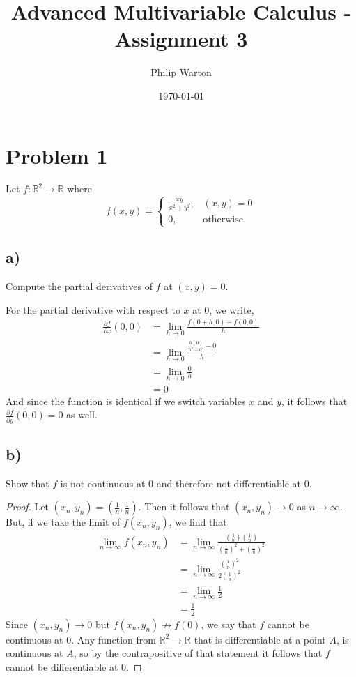\documentclass{article}
\theoremstyle{definition}
\begin{document}
\title{Advanced Multivariable Calculus - Assignment 3}
\author{Philip Warton}
\date{\today}
\maketitle
\section*{Problem 1}
Let $f: \mathbb{R}^2 \rightarrow \mathbb{R}$ where
\[
    f(x,y) = \begin{cases}
        \frac{xy}{x^2 + y^2}, & (x,y)= 0\\
        0, & \text{otherwise}
    \end{cases}
\]
\subsection*{a)}
\begin{mdframed}
    Compute the partial derivatives of $f$ at $(x,y) = 0$.
\end{mdframed}
For the partial derivative with respect to $x$ at 0, we write,
\begin{align*}
    \frac{\partial f}{\partial x}(0,0) &= \lim_{h \rightarrow 0} \frac{f(0 + h, 0) - f(0,0)}{h}\\
    &= \lim_{h \rightarrow 0} \frac{\frac{h(0)}{h^2 + 0^2} - 0}{h}\\
    &= \lim_{h \rightarrow 0} \frac{0}{h} \\
    &= 0
\end{align*}
And since the function is identical if we switch variables $x$ and $y$, it follows that $\frac{\partial f}{\partial y}(0,0) = 0$ as well.
\subsection*{b)}
\begin{mdframed}
    Show that $f$ is not continuous at 0 and therefore not differentiable at 0.
\end{mdframed}
\begin{proof}
    Let $(x_n,y_n) = (\frac{1}{n},\frac{1}{n})$. Then it follows that $(x_n,y_n) \rightarrow 0$ as $n \rightarrow \infty$.
    But, if we take the limit of $f(x_n,y_n)$, we find that
    \begin{align*}
        \lim_{n \rightarrow \infty} f(x_n,y_n) &= \lim_{n\rightarrow \infty}\frac{(\frac{1}{n})(\frac{1}{n})}{(\frac{1}{n})^2 + (\frac{1}{n})^2}\\
        &= \lim_{n\rightarrow \infty} \frac{(\frac{1}{n})^2}{2(\frac{1}{n})^2}\\
        &= \lim_{n \rightarrow \infty} \frac{1}{2}\\
        &= \frac{1}{2}
    \end{align*}
    Since $(x_n,y_n) \rightarrow 0$ but $f(x_n,y_n) \not \rightarrow f(0)$, we say that $f$ cannot be continuous at 0.
    Any function from $\mathbb{R}^2 \rightarrow \mathbb{R}$ that is differentiable at a point $A$, is continuous at $A$,
    so by the contrapositive of that statement it follows that $f$ cannot be differentiable at $0$.
\end{proof}
\end{document}
